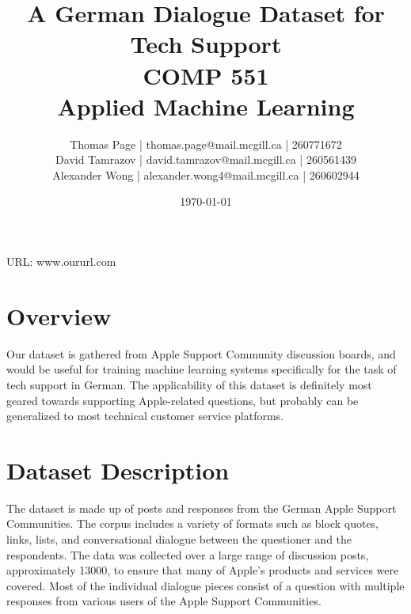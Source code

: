 \documentclass[10pt]{article}
\title{A German Dialogue Dataset for Tech Support\\ COMP 551 \\ Applied Machine Learning} %
\author{
Thomas Page | thomas.page@mail.mcgill.ca | 260771672 \\
David Tamrazov | david.tamrazov@mail.mcgill.ca | 260561439 \\
Alexander Wong | alexander.wong4@mail.mcgill.ca | 260602944} %
\date{\today} %
\begin{document}
\maketitle %


%

\begin{center}
URL: www.oururl.com
\end{center}
\begin{multicols}{2}

\section{Overview}
Our dataset is gathered from Apple Support Community discussion boards, and would be useful for training machine learning systems specifically for the task of tech support in German. The applicability of this dataset is definitely most geared towards supporting Apple-related questions, but probably can be generalized to most technical customer service platforms.


\section{Dataset Description}
The dataset is made up of posts and responses from the German Apple Support Communities. The corpus includes a variety of formats such as block quotes, links, lists, and conversational dialogue between the questioner and the respondents. The data was collected over a large range of discussion posts, approximately 13000, to ensure that many of Apple's products and services were covered. Most of the individual dialogue pieces consist of a question with multiple responses from various users of the Apple Support Communities.\\


\end{multicols}
\end{document}
